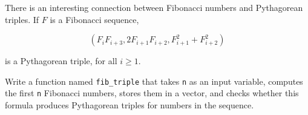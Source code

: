 \begin{ex}

There is an interesting connection between Fibonacci numbers and
Pythagorean triples.  If $F$ is a Fibonacci sequence,

\begin{equation}
(F_i F_{i+3}, 2 F_{i+1} F_{i+2}, F_{i+1}^2 + F_{i+2}^2 )
\end{equation}

is a Pythagorean triple, for all $i \ge 1$.

Write a function named {\tt fib\_triple} that
takes {\tt n} as an input variable, computes 
the first {\tt n} Fibonacci numbers, stores them in a vector,
and checks whether this formula produces Pythagorean triples for numbers in the sequence.

\end{ex}


